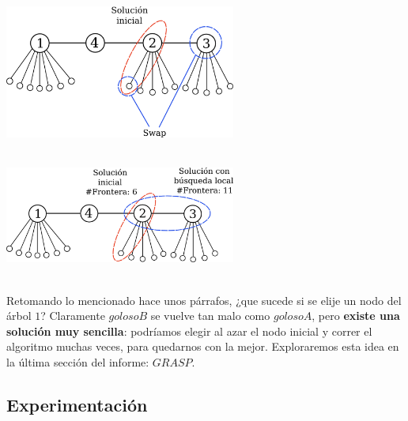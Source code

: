{\centering
    \includegraphics[width=0.57\textwidth]{informe/imgs/local_base_nodes_v2.png} \\
}
$ $\newline

{\centering
    \includegraphics[width=0.57\textwidth]{informe/imgs/local_base_nodes_v3.png} \\
}
$ $\newline

Retomando lo mencionado hace unos párrafos, ¿que sucede si se elije un nodo del árbol $1$? Claramente $golosoB$ se vuelve tan malo como $golosoA$, pero \textbf{existe una solución muy sencilla}: podríamos elegir al azar el nodo inicial y correr el algoritmo muchas veces, para quedarnos con la mejor. Exploraremos esta idea en la última sección del informe: $GRASP$.

\subsection{Experimentación}
